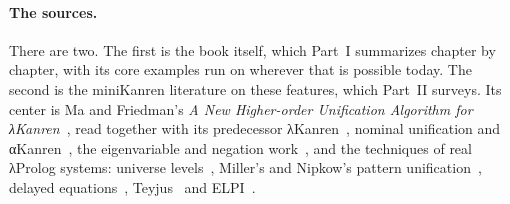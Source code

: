 \paragraph{The sources.} There are two. The first is the book itself, which Part~I summarizes chapter by
chapter, with its core examples run on \micro{} wherever that is possible today. The second is the
miniKanren literature on these features, which Part~II surveys. Its center is
Ma and Friedman's \emph{A New Higher-order Unification Algorithm for λKanren}~\cite{MaFriedman2021}, read
together with its predecessor λKanren~\cite{MaLuFriedman2020}, nominal unification and
αKanren~\cite{UrbanPittsGabbay2004,ByrdFriedman2007}, the eigenvariable and negation
work~\cite{HemannByrdFriedman2013,Moiseenko2019,JinEtAl2021}, and the techniques of real λProlog systems:
universe levels~\cite{NadathurJayaramanKwon1995}, Miller's and Nipkow's pattern
unification~\cite{Miller1991,Nipkow1993}, delayed equations~\cite{DowekHardinKirchnerPfenning1996},
Teyjus~\cite{NadathurLinnell2005} and ELPI~\cite{DunchevEtAl2015}.


